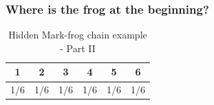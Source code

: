 \documentclass[xcolor=dvipsnames, compress]{beamer}
\begin{document}
\begin{frame}
\frametitle{Where is the frog at the beginning?}


\begin{table}
	\begin{centering}
		\begin{tabular}{|c|c|c|c|c|c|}
			\hline 
			1 & 2 & 3 & 4 & 5 & 6\\
			\hline 
			\hline 
			1/6 & 1/6 & 1/6 & 1/6 & 1/6 & 1/6\\
			\hline 
		\end{tabular}
	\end{centering}
	\caption{Hidden Mark-frog chain example - Part II}
\end{table}
\end{frame}
\end{document}
